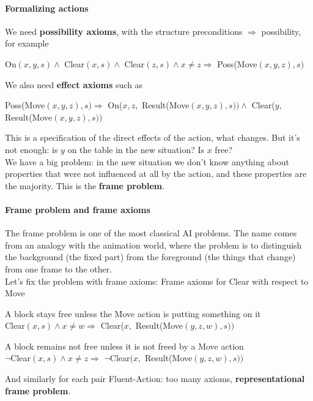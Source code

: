 \documentclass[10pt]{report}
\begin{document}
\paragraph{Formalizing actions} We need \textbf{possibility axioms}, with the structure preconditions $\Rightarrow$ possibility, for example
\begin{list}{}{}
	\item On$(x,y,s)\wedge$ Clear$(x,s)\wedge$ Clear$(z,s)\wedge x\neq z \Rightarrow$ Poss(Move$(x,y,z),s)$
\end{list}
We also need \textbf{effect axioms} such as
\begin{list}{}{}
	\item Poss(Move$(x,y,z),s)\Rightarrow$ On($x,z,$ Result(Move$(x,y,z),s))\wedge$ Clear($y,$ Result(Move$(x,y,z),s))$
\end{list}
This is a specification of the direct effects of the action, what changes. But it's not enough: is $y$ on the table in the new situation? Is $x$ free?\\
We have a big problem: in the new situation we don't know anything about properties that were not influenced at all by the action, and these properties are the majority. This is the \textbf{frame problem}.
\paragraph{Frame problem and frame axioms} The frame problem is one of the most classical AI problems. The name comes from an analogy with the animation world, where the problem is to distinguish the background (the fixed part) from the foreground (the things that change) from one frame to the other.\\
Let's fix the problem with frame axioms: Frame axioms for Clear with respect to Move
\begin{list}{}{}
	\item A block stays free unless the Move action is putting something on it\\
	Clear$(x,s)\wedge x\neq w\Rightarrow$ Clear($x,$ Result(Move$(y,z,w),s))$
	\item A block remains not free unless it is not freed by a Move action\\
	$\neg$Clear$(x,s)\wedge x\neq z\Rightarrow$ $\neg$Clear$(x,$ Result(Move$(y,z,w),s))$
\end{list}
And similarly for each pair Fluent-Action: too many axioms, \textbf{representational frame problem}.
\end{document}
